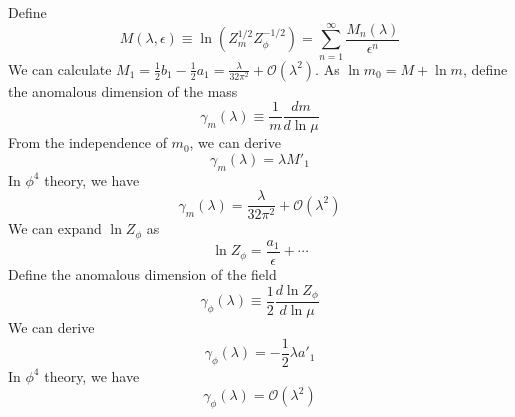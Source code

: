 \documentclass[cyan]{elegantnote}
\begin{document}
Define
\[M(\lambda,\epsilon) \equiv \ln(Z_{m}^{1/2} Z_{\phi}^{-1/2}) = \sum_{n=1}^{\infty} \frac{M_n(\lambda)}{\epsilon^n}\]
We can calculate $M_1 = \frac{1}{2}b_1 - \frac{1}{2}a_1 = \frac{\lambda}{32\pi^2} + \mathcal{O}(\lambda^2)$.
As $\ln m_0 = M + \ln m $, define the anomalous dimension of the mass
\[\gamma_m(\lambda) \equiv \frac{1}{m} \frac{dm}{d \ln \mu}\]
From the independence of $m_0$, we can derive
\[\gamma_m(\lambda) = \lambda M'_1\]
In $\phi^4$ theory, we have
\[\gamma_m(\lambda) = \frac{\lambda}{32\pi^2} + \mathcal{O}(\lambda^2)\]
We can expand $\ln Z_{\phi}$ as
\[\ln Z_{\phi} = \frac{a_1}{\epsilon} + \cdots\]
Define the anomalous dimension of the field
\[\gamma_{\phi}(\lambda) \equiv \frac{1}{2} \frac{d\ln Z_{\phi}}{d \ln \mu}\]
We can derive
\[\gamma_{\phi}(\lambda) = -\frac{1}{2}\lambda a'_1\]
In $\phi^4$ theory, we have
\[\gamma_{\phi}(\lambda) = \mathcal{O}(\lambda^2)\]
\end{document}
